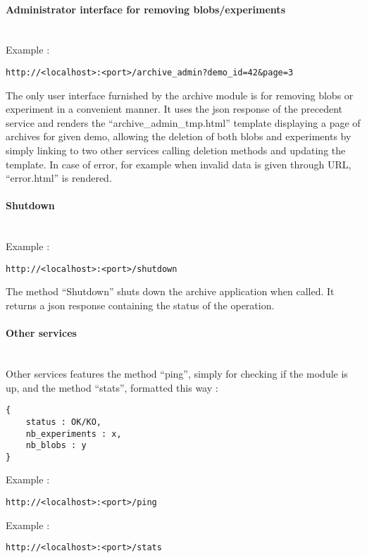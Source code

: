 \paragraph{Administrator interface for removing blobs/experiments} \hspace{0pt} \\
Example :
\begin{verbatim}
http://<localhost>:<port>/archive_admin?demo_id=42&page=3
\end{verbatim}
The only user interface furnished by the archive module is for removing blobs or experiment in a convenient manner. It uses the json response of the precedent service and renders the ``archive\_admin\_tmp.html'' template displaying a page of archives for given demo, allowing the deletion of both blobs and experiments by simply linking to two other services calling deletion methods and updating the template. In case of error, for example when invalid data is given through URL, ``error.html'' is rendered.

\paragraph{Shutdown} \hspace{0pt} \\
Example :
\begin{verbatim}
http://<localhost>:<port>/shutdown
\end{verbatim}
The method ``Shutdown'' shuts down the archive application when called. It returns a json response containing the status of the operation.

\paragraph{Other services} \hspace{0pt} \\
Other services features the method ``ping'', simply for checking if the module is up, and the method ``stats'', formatted this way :
\begin{verbatim}
{
    status : OK/KO,
    nb_experiments : x,
    nb_blobs : y
}
\end{verbatim}
Example :
\begin{verbatim}
http://<localhost>:<port>/ping
\end{verbatim}
Example :
\begin{verbatim}
http://<localhost>:<port>/stats
\end{verbatim}

